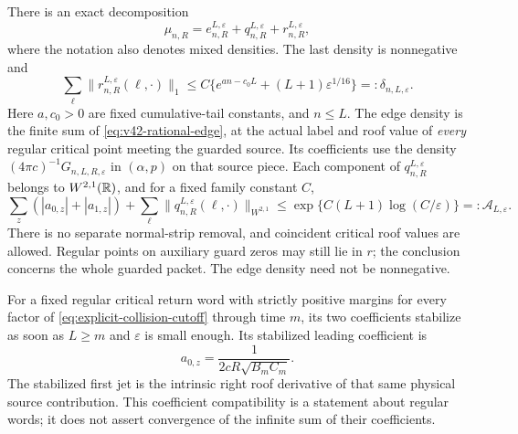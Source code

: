 \begin{theorem}
\label{thm:v42-regular-critical-packet}
There is an exact decomposition
\begin{equation}\label{eq:v42-exact-density-packet}
 \mu_{n,R}=e_{n,R}^{L,\varepsilon}+q_{n,R}^{L,\varepsilon}
                                      +r_{n,R}^{L,\varepsilon},
\end{equation}
where the notation also denotes mixed densities. The last density is
nonnegative and
\begin{equation}\label{eq:v42-removed-mass}
 \sum_\ell\|r_{n,R}^{L,\varepsilon}(\ell,\cdot)\|_1
   \le C\{e^{an-c_0L}+(L+1)\varepsilon^{1/16}\}=:\delta_{n,L,\varepsilon}.
\end{equation}
Here $a,c_0>0$ are fixed cumulative-tail constants, and $n\le L$.
The edge density is the finite sum of
\eqref{eq:v42-rational-edge}, at the actual label and roof value of
\emph{every} regular critical point meeting the guarded source.
Its coefficients use the density
$(4\pi c)^{-1}G_{n,L,R,\varepsilon}$ in $(\alpha,p)$ on that source
piece. Each component of $q_{n,R}^{L,\varepsilon}$ belongs to
$W^{2,1}(\mathbb R)$, and for a fixed family constant $C$,
\begin{equation}\label{eq:v42-summed-derivative-budget}
 \sum_z(|a_{0,z}|+|a_{1,z}|)
       +\sum_\ell\|q_{n,R}^{L,\varepsilon}(\ell,\cdot)\|_{W^{2,1}}
       \le \exp\{C(L+1)\log(C/\varepsilon)\}=:\mathcal A_{L,\varepsilon}.
\end{equation}
There is no separate normal-strip removal, and coincident critical
roof values are allowed. Regular points on auxiliary guard zeros may
still lie in $r$; the conclusion concerns the whole guarded packet.
The edge density need not be nonnegative.

For a fixed regular critical return word with strictly positive margins
for every factor of \eqref{eq:explicit-collision-cutoff} through time $m$,
its two coefficients stabilize as soon as $L\ge m$ and
$\varepsilon$ is small enough. Its stabilized leading coefficient is
\begin{equation}\label{eq:v42-physical-critical-jump}
 a_{0,z}=\frac1{2cR\sqrt{B_mC_m}}.
\end{equation}
The stabilized first jet is the intrinsic right roof derivative of
that same physical source contribution. This coefficient compatibility
is a statement about regular words; it does not assert convergence of
the infinite sum of their coefficients.
\end{theorem}
